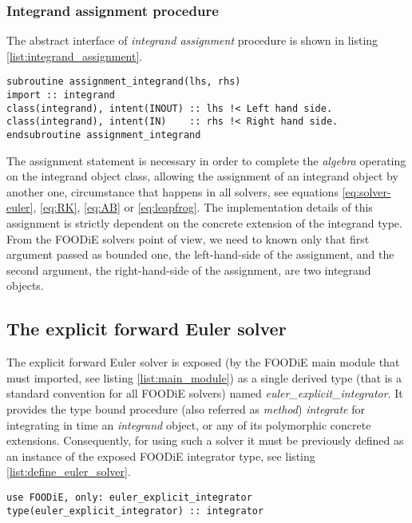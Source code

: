 \documentclass[pdftex,preprint,3p,times,numbers]{elsarticle}
\begin{document}
\subsubsection{Integrand assignment procedure}

The abstract interface of \emph{integrand assignment} procedure is shown in listing \ref{list:integrand_assignment}.

\begin{lstlisting}[firstnumber=1,style=code,caption={integrand assignment procedure interface},label={list:integrand_assignment}]
subroutine assignment_integrand(lhs, rhs)
import :: integrand
class(integrand), intent(INOUT) :: lhs !< Left hand side.
class(integrand), intent(IN)    :: rhs !< Right hand side.
endsubroutine assignment_integrand
\end{lstlisting}

The assignment statement is necessary in order to complete the \emph{algebra} operating on the integrand object class, allowing the assignment of an integrand object by another one, circumstance that happens in all solvers, see equations \ref{eq:solver-euler}, \ref{eq:RK}, \ref{eq:AB} or \ref{eq:leapfrog}. The implementation details of this assignment is strictly dependent on the concrete extension of the integrand type. From the FOODiE solvers point of view, we need to known only that first argument passed as bounded one, the left-hand-side of the assignment, and the second argument, the right-hand-side of the assignment, are two integrand objects.

\clearpage

\subsection{The explicit forward Euler solver}\label{subsec:solver_euler}

The explicit forward Euler solver is exposed (by the FOODiE main module that must imported, see listing \ref{list:main_module}) as a single derived type (that is a standard convention for all FOODiE solvers) named \emph{euler\_explicit\_integrator}. It provides the type bound procedure (also referred as \emph{method}) \emph{integrate} for integrating in time an \emph{integrand} object, or any of its polymorphic concrete extensions. Consequently, for using such a solver it must be previously defined as an instance of the exposed FOODiE integrator type, see listing \ref{list:define_euler_solver}.

\begin{lstlisting}[firstnumber=1,style=code,caption={definition of an explicit forward Euler integrator},label={list:define_euler_solver}]
use FOODiE, only: euler_explicit_integrator
type(euler_explicit_integrator) :: integrator
\end{lstlisting}
\end{document}
